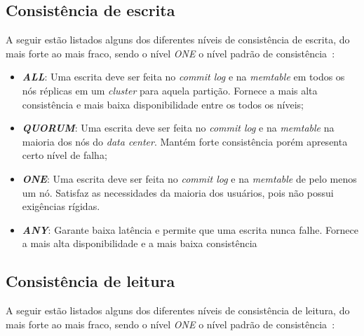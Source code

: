 \subsection*{Consistência de escrita}

A seguir estão listados alguns dos diferentes níveis de consistência de escrita, do mais forte ao mais fraco, sendo o nível \emph{ONE} o nível padrão de consistência~\cite{cassandraguide}:

\begin{itemize}

\item \textbf{\emph{ALL}}: Uma escrita deve ser feita no \emph{commit log} e na \emph{memtable} em todos os nós réplicas em um \emph{cluster} para aquela partição. Fornece a mais alta consistência e mais baixa disponibilidade entre os todos os níveis; 

\item \textbf{\emph{QUORUM}}: Uma escrita deve ser feita no \emph{commit log} e na \emph{memtable} na maioria dos nós do \emph{data center}. Mantém forte consistência porém apresenta certo nível de falha;

\item \textbf{\emph{ONE}}: Uma escrita deve ser feita no \emph{commit log} e na \emph{memtable} de pelo menos um nó. Satisfaz as necessidades da maioria dos usuários, pois não possui exigências rígidas.

\item \textbf{\emph{ANY}}: Garante baixa latência e permite que uma escrita nunca falhe. Fornece a mais alta disponibilidade e a mais baixa consistência

\end{itemize}

\subsection*{Consistência de leitura}

A seguir estão listados alguns dos diferentes níveis de consistência de leitura, do mais forte ao mais fraco, sendo o nível \emph{ONE} o nível padrão de consistência~\cite{cassandraguide}:

